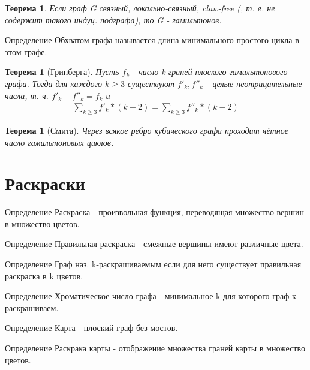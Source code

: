 \documentclass[a4paper,openany]{book}
\newcounter{TheoremCounter}
\newtheorem{theorem}[TheoremCounter]{Теорема}
\newenvironment{definition}
{\begin{statement}{Определение}}
    {\end{statement}}
\begin{document}
\begin{theorem}
  Если граф G связный, локально-связный,  claw-free (, т. е. не содержит такого индуц. подграфа), то G - гамильтонов.
\end{theorem}

\begin{definition}
  Обхватом графа называется длина минимального простого цикла в этом графе.
\end{definition}

\begin{theorem}[Гринберга]
  Пусть $f_k$ - число k-граней плоского гамильтонового графа. Тогда для каждого
  $k \geqslant 3$ существуют $f'_k,f''_k$ - целые неотрицательные числа, т. ч.
  $f'_k + f''_k = f_k$  и
  \begin{align*}
    \sum_{k \geqslant 3}f'_k*(k-2) = \sum_{k \geqslant 3}f''_k*(k-2)
  \end{align*}
\end{theorem}

\begin{theorem}[Смита]
  Через всякое ребро кубического графа проходит чётное число гамильтоновых циклов.
\end{theorem}


\chapter{Раскраски}
\begin{definition}
  Раскраска - произвольная функция, переводящая множество вершин в множество цветов.
\end{definition}

\begin{definition}
  Правильная раскраска - смежные вершины имеют различные цвета.
\end{definition}

\begin{definition}
  Граф наз. k-раскрашиваемым если для него существует правильная раскраска в k цветов.
\end{definition}

\begin{definition}
  Хроматическое число графа - минимальное k для которого граф  к-раскрашиваем.
\end{definition}

\begin{definition}
  Карта - плоский граф без мостов.
\end{definition}

\begin{definition}
  Раскрака карты - отображение множества граней карты в множество цветов.
\end{definition}
\end{document}
